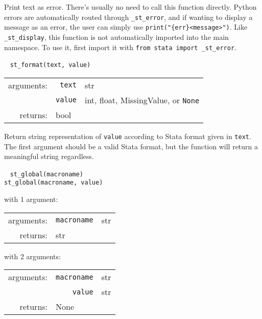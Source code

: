 \documentclass{article}
\begin{document}
			\vspace{1.5mm}
			\noindent Print text as error. There's usually no need to call this function directly. Python errors are automatically routed through \lstinline{_st_error}, and if wanting to display a message as an error, the user can simply use \lstinline$print("{err}<message>")$. Like \lstinline{_st_display}, this function is not automatically imported into the main namespace. To use it, first import it with \lstinline{from stata import _st_error}. \newline
			
			
			\ \newline
			\noindent \lstinline$st_format(text, value)$
								
			\vspace{1.5mm}
			\noindent 
			\indent \begin{tabular}{rrl}
					arguments: & \texttt{text} & str \\
					 & \texttt{value} & int, float, MissingValue, or \lstinline$None$ \\
					returns: & \multicolumn{2}{l}{bool}
				\end{tabular}
								
			\vspace{1.5mm}
			\noindent Return string representation of \lstinline{value} according to Stata format given in \lstinline{text}. The first argument should be a valid Stata format, but the function will return a meaningful string regardless. \newline
			
			
			\ \newline
			\noindent \lstinline$st_global(macroname)$ \\
			\noindent \lstinline$st_global(macroname, value)$
								
			\vspace{1.5mm}
			\noindent 
			\indent with 1 argument:
			
			\indent \qquad \begin{tabular}{rrl}
					arguments: & \texttt{macroname} & str \\
					returns: & \multicolumn{2}{l}{str}
				\end{tabular}
								
			\vspace{1.5mm}
			\noindent
			\indent with 2 arguments:
			
			\indent \qquad \begin{tabular}{rrl}
					arguments: & \texttt{macroname} & str \\
					  & \texttt{value} & str \\
					returns: & \multicolumn{2}{l}{None}
				\end{tabular}
								
\end{document}
